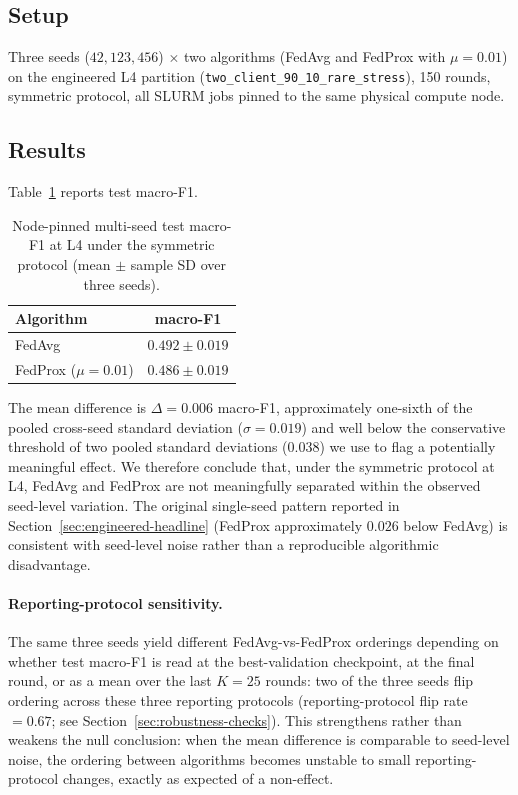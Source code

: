 \documentclass[11pt,a4paper]{report}
\begin{document}
\subsection{Setup}
Three seeds ($42, 123, 456$) $\times$ two algorithms (FedAvg and
FedProx with $\mu = 0.01$) on the engineered L4 partition
(\texttt{two\_client\_90\_10\_rare\_stress}), 150 rounds, symmetric
protocol, all SLURM jobs pinned to the same physical compute node.

\subsection{Results}
Table~\ref{tab:node-pinned-l4} reports test macro-F1.

\begin{table}[!htbp]
\centering
\caption{Node-pinned multi-seed test macro-F1 at L4 under the
symmetric protocol (mean $\pm$ sample SD over three seeds).}
\label{tab:node-pinned-l4}
\small
\begin{tabular}{lc}
\toprule
Algorithm & macro-F1 \\
\midrule
FedAvg                  & $0.492 \pm 0.019$ \\
FedProx ($\mu = 0.01$)  & $0.486 \pm 0.019$ \\
\bottomrule
\end{tabular}
\end{table}

The mean difference is $\Delta = 0.006$ macro-F1, approximately
one-sixth of the pooled cross-seed standard deviation
($\sigma = 0.019$) and well below the conservative threshold of two
pooled standard deviations ($0.038$) we use to flag a potentially
meaningful effect. We therefore conclude that, under the symmetric
protocol at L4, FedAvg and FedProx are not meaningfully separated
within the observed seed-level variation. The original single-seed
pattern reported in Section~\ref{sec:engineered-headline}
(FedProx approximately $0.026$ below FedAvg) is consistent with
seed-level noise rather than a reproducible algorithmic disadvantage.

\paragraph{Reporting-protocol sensitivity.} The same three seeds
yield different FedAvg-vs-FedProx orderings depending on whether
test macro-F1 is read at the best-validation checkpoint, at the
final round, or as a mean over the last $K = 25$ rounds: two of the
three seeds flip ordering across these three reporting protocols
(reporting-protocol flip rate $= 0.67$; see
Section~\ref{sec:robustness-checks}). This strengthens rather than
weakens the null conclusion: when the mean difference is comparable
to seed-level noise, the ordering between algorithms becomes
unstable to small reporting-protocol changes, exactly as expected
of a non-effect.
\end{document}
